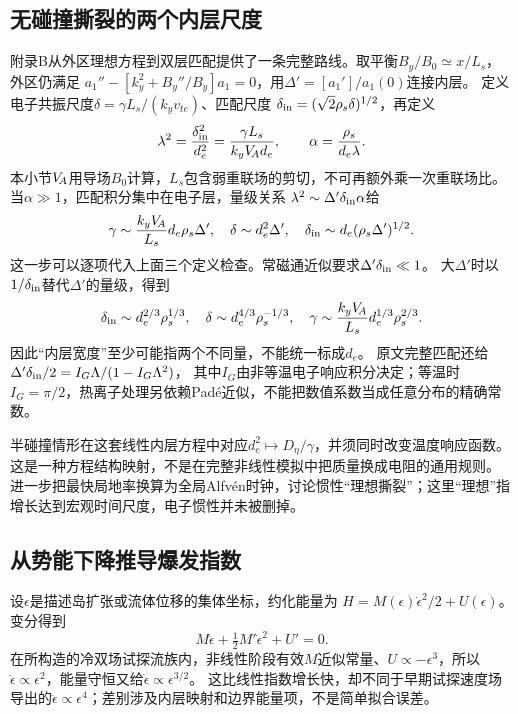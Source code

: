 \subsection{无碰撞撕裂的两个内层尺度}
\citet{E512}附录B从外区理想方程到双层匹配提供了一条完整路线。取平衡$B_y/B_0\simeq x/L_s$，外区仍满足
$a_1''-[k_y^2+B_y''/B_y]a_1=0$，用$\Delta'=[a_1']/a_1(0)$连接内层。
定义电子共振尺度$\delta=\gamma L_s/(k_yv_{te})$、匹配尺度
$\delta_{\rm in}=(\sqrt2\rho_s\delta)^{1/2}$，再定义
\begin{equation}
 \lambda^2={\delta_{\rm in}^2\over d_e^2}={\gamma L_s\over k_yV_{\!A} d_e},\qquad
 \alpha={\rho_s\over d_e\lambda}.
\end{equation}
本小节$V_{\!A}$用导场$B_0$计算，$L_s$包含弱重联场的剪切，不可再额外乘一次重联场比。
当$\alpha\gg1$，匹配积分集中在电子层，量级关系
$\lambda^2\sim\Delta'\delta_{\rm in}\alpha$给
\begin{equation}
 \gamma\sim{k_yV_{\!A}\over L_s}d_e\rho_s\Delta',\quad
 \delta\sim d_e^2\Delta',\quad
 \delta_{\rm in}\sim d_e(\rho_s\Delta')^{1/2}.
\end{equation}
这一步可以逐项代入上面三个定义检查。常磁通近似要求$\Delta'\delta_{\rm in}\ll1$。
大$\Delta'$时以$1/\delta_{\rm in}$替代$\Delta'$的量级，得到
\begin{equation}
 \delta_{\rm in}\sim d_e^{2/3}\rho_s^{1/3},\quad
 \delta\sim d_e^{4/3}\rho_s^{-1/3},\quad
 \gamma\sim{k_yV_{\!A}\over L_s}d_e^{1/3}\rho_s^{2/3}.
\end{equation}
因此“内层宽度”至少可能指两个不同量，不能统一标成$d_e$。
原文完整匹配还给$\Delta'\delta_{\rm in}/2=I_G\Lambda/(1-I_G\Lambda^2)$，
其中$I_G$由非等温电子响应积分决定；等温时$I_G=\pi/2$，热离子处理另依赖Padé近似，不能把数值系数当成任意分布的精确常数。

半碰撞情形在这套线性内层方程中对应$d_e^2\mapsto D_\eta/\gamma$，并须同时改变温度响应函数。
这是一种方程结构映射，不是在完整非线性模拟中把质量换成电阻的通用规则。
\citet{L210}进一步把最快局地率换算为全局Alfvén时钟，讨论惯性“理想撕裂”；这里“理想”指增长达到宏观时间尺度，电子惯性并未被删掉。

\subsection{从势能下降推导爆发指数}
设$\epsilon$是描述岛扩张或流体位移的集体坐标，约化能量为
$H=M(\epsilon)\dot\epsilon^2/2+U(\epsilon)$。
变分得到
\begin{equation}
 M\ddot\epsilon+\tfrac12M'\dot\epsilon^2+U'=0.
\end{equation}
\citet{L191}在所构造的冷双场试探流族内，非线性阶段有效$M$近似常量、$U\propto-\epsilon^3$，所以
$\ddot\epsilon\propto\epsilon^2$，能量守恒又给$\dot\epsilon\propto\epsilon^{3/2}$。
这比线性指数增长快，却不同于早期试探速度场导出的$\ddot\epsilon\propto\epsilon^4$；差别涉及内层映射和边界能量项，不是简单拟合误差。

